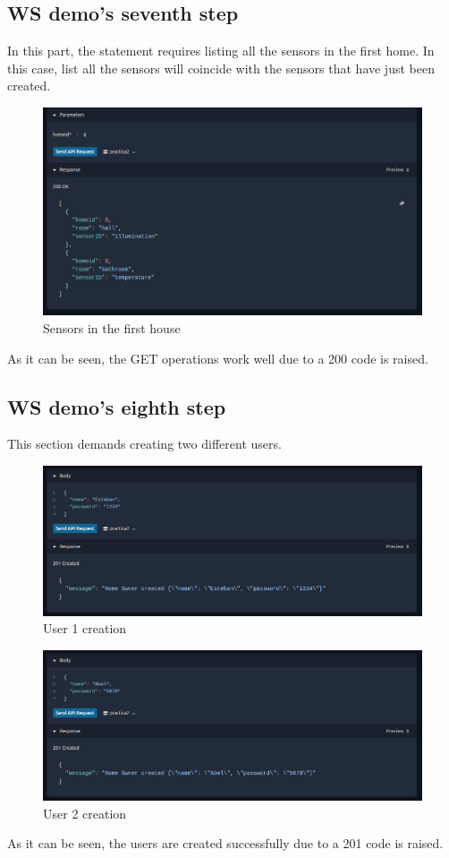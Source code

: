 \documentclass[a4paper,12pt]{article}
\begin{document}
\subsection*{WS demo's seventh step}
In this part, the statement requires listing all the sensors in the first home. In this case, list all the sensors will coincide with the sensors that have just been created.
\begin{figure}[H]
    \centering
    \includegraphics[scale = 0.5]{images/First house sensors.png}
    \caption{Sensors in the first house}
    \label{fig:sensorshouse1}
\end{figure}
As it can be seen, the GET operations work well due to a 200 code is raised.
\subsection*{WS demo's eighth step}
This section demands creating two different users.
\begin{figure}[H]
    \centering
    \includegraphics[scale = 0.5]{images/User 1 created.png}
    \caption{User 1 creation}
    \label{fig:user1C}
\end{figure}
\begin{figure}[H]
    \centering
    \includegraphics[scale = 0.5]{images/User 2 created.png}
    \caption{User 2 creation}
    \label{fig:user2C}
\end{figure}
As it can be seen, the users are created successfully due to a 201 code is raised.
\end{document}

